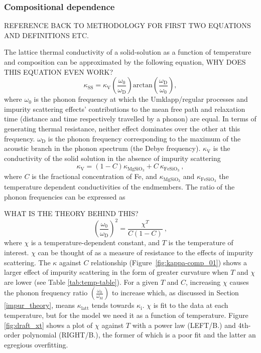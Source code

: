 \subsubsection{Compositional dependence}

REFERENCE BACK TO METHODOLOGY FOR FIRST TWO EQUATIONS AND DEFINITIONS ETC.

The lattice thermal conductivity of a solid-solution as a function of temperature and composition can be approximated by the following equation,
%
WHY DOES THIS EQUATION EVEN WORK?
%
\begin{equation}
\kappa_{\mathrm{SS}}=\kappa_{\mathrm{V}}\left ( \frac{\omega_{\mathrm{0}}}{\omega_{\mathrm{D}}} \right )\mathrm{arctan}\left ( \frac{\omega_{\mathrm{D}}}{\omega_{\mathrm{0}}} \right ),
\label{eq.ohta7}
\end{equation}
%
where $\omega_{\mathrm{0}}$ is the phonon frequency at which the Umklapp/regular processes and impurity scattering effects' contributions to the mean free path and relaxation time (distance and time respectively travelled by a phonon) are equal. In terms of generating thermal resistance, neither effect dominates over the other at this frequency. $\omega_{\mathrm{D}}$ is the phonon frequency corresponding to the maximum of the acoustic branch in the phonon spectrum (the Debye frequency). $\kappa_{\mathrm{V}}$ is the conductivity of the solid solution in the absence of impurity scattering
%
\begin{equation}
\kappa_{\mathrm{V}}=\left ( 1-C \right )\kappa_{\mathrm{MgSiO_{3}}}+C\ \kappa_{\mathrm{FeSiO_{3}}}\ ,
\label{eq.ohta9}
\end{equation}
%
where $C$ is the fractional concentration of Fe, and $\kappa_{\mathrm{MgSiO_{3}}}$ and $\kappa_{\mathrm{FeSiO_{3}}}$ the temperature dependent conductivities of the endmembers. The ratio of the phonon frequencies can be expressed as

WHAT IS THE THEORY BEHIND THIS?
%
\begin{equation}
\left ( \frac{\omega_{\mathrm{0}}}{\omega_{\mathrm{D}}} \right )^{2}=\frac{\chi^{T}}{C\left ( 1-C \right )}\ ,
\label{eq.ohta8}
\end{equation}
%
where $\chi$ is a temperature-dependent constant, and $T$ is the temperature of interest. $\chi$ can be thought of as a measure of resistance to the effects of impurity scattering. The $\kappa$ against $C$ relationship (Figure~\ref{fig:kappa-comp_01}) shows a larger effect of impurity scattering in the form of greater curvature when $T$ and $\chi$ are lower (see Table \ref{tab:temp-table}). For a given $T$ and $C$, increasing $\chi$ causes the phonon frequency ratio $\left ( \frac{\omega_{\mathrm{0}}}{\omega_{\mathrm{M}}}\right )$ to increase which, as discussed in Section \ref{impur_theory}, means $\kappa_{\mathrm{latt}}$ tends towards $\kappa_{\mathrm{i}}$. $\chi$ is fit to the data at each temperature, but for the model we need it as a function of temperature. Figure \ref{fig:draft_xt} shows a plot of $\chi$ against $T$ with a power law (LEFT/B.) and 4th-order polynomial (RIGHT/B.), the former of which is a poor fit and the latter an egregious overfitting. 

